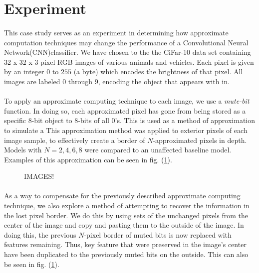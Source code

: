 \documentclass[12pt,letterpaper]{article}
\begin{document}

\section*{Experiment}

\paragraph*{}This case study serves as an experiment in determining how approximate computation techniques may change the performance of a Convolutional Neural Network(CNN)classifier. We have chosen to the the CiFar-10 data set containing 32 x 32 x 3 pixel RGB images of various animals and vehicles. Each pixel is given by an integer $0$ to $255$ (a byte) which encodes the brightness of that pixel. All images are labeled $0$ through $9$, encoding the object that appears with in.
 
\paragraph*{}To apply an approximate computing technique to each image, we use a \textit{mute-bit} function. In doing so, each approximated pixel has gone from being stored as a specific $8$-bit object to $8$-bits of all $0$'s. This is used as a method of approximation to simulate a  This approximation method was applied to exterior pixels of each image sample, to effectively create a border of $N$-approximated pixels in depth. Models with $N = 2,4,6,8$ were compared to an unaffected baseline model. Examples of this approximation can be seen in fig. (\ref{images}).

\begin{figure}[h]
\label{images}
IMAGES!
\end{figure}

\paragraph*{}As a way to compensate for the previously described approximate computing technique, we also explore a method of attempting to recover the information in the lost pixel border. We do this by using sets of the unchanged pixels from the center of the image and copy and pasting them to the outside of the image. In doing this, the previous $N$-pixel border of muted bits is now replaced with features remaining. Thus, key feature that were preserved in the image's center have been duplicated to the previously muted bits on the outside. This can also be seen in fig. (\ref{images}).
\end{document}
